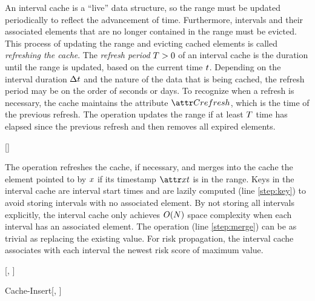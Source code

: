 An interval cache is a ``live'' data structure, so the range must be updated periodically to reflect the advancement of time. Furthermore, intervals and their associated elements that are no longer contained in the range must be evicted. This process of updating the range and evicting cached elements is called \emph{refreshing the cache}. The \emph{refresh period} $T > 0$ of an interval cache is the duration until the range is updated, based on the current time $t$. Depending on the interval duration ${\Delta}t$ and the nature of the data that is being cached, the refresh period may be on the order of seconds or days. To recognize when a refresh is necessary, the cache maintains the attribute $\aCacheRefresh$, which is the time of the previous refresh. The operation \cCacheRefresh updates the range if at least $T$ time has elapsed since the previous refresh and then removes all expired elements.
%
\begin{function}{\nCacheRefresh}[\vCache]
    \mState{\vTime \assign \cGetTime}
    \mIf{\vTime - \aCacheRefresh > \pCacheRefreshPeriod}
    	\mState{\aCacheStart \assign \vTime - \pCacheLookBack}
    	\mState{\aCacheEnd \assign \vTime + \pCacheLookAhead}
    	\mState{\aCacheRefresh \assign \vTime}
    	\mForEach{\vCacheItem \in \vCache}
    		\mIf{\aCacheItemKey < \aCacheStart}
    			\mState{\cDelete[\vCache, \vCacheItem]}
    		\EndIf
    	\EndFor
    \EndIf
    \end{function}

The operation \cCacheInsert refreshes the cache, if necessary, and merges into the cache the element pointed to by $x$ if its timestamp $\aCacheItemTime$ is in the range. Keys in the interval cache are interval start times and are lazily computed (line \ref{step:key}) to avoid storing intervals with no associated element. By not storing all intervals explicitly, the interval cache only achieves $O(N)$ space complexity when each interval has an associated element. The \cMerge operation (line \ref{step:merge}) can be as trivial as replacing the existing value. For risk propagation, the interval cache associates with each interval the newest risk score of maximum value.
%
\begin{function}{\nCacheKey}[\vCache, \vCacheItem]
    \mReturn{\aCacheStart + \floor{\frac{\aCacheItemTime - \aCacheStart}{\pDuration}} \cdot \pDuration}
\end{function}
%
\begin{function}{Cache-Insert}[\vCache, \vCacheItem]
    \mIf{\aCacheItemTime \in [\aCacheStart, \aCacheEnd)}
    	\mState{\aCacheItemKey \assign \cCacheKey[\vCache, \vCacheItem]} \label{step:key}
    	\mState{\vOldCacheItem \assign \cSearch[\vCache, \vCacheItem]}
    	\mIf{\vOldCacheItem \equals \nil}
    		\mState{\vNewCacheItem \assign \vCacheItem}
    	\Else
    		\mState{\vNewCacheItem \assign \cMerge[\vOldCacheItem, \vCacheItem]} \label{step:merge}
    	\EndIf
    	\mState{\cInsert[\vCache, \vNewCacheItem]}
    \EndIf
\end{function}

